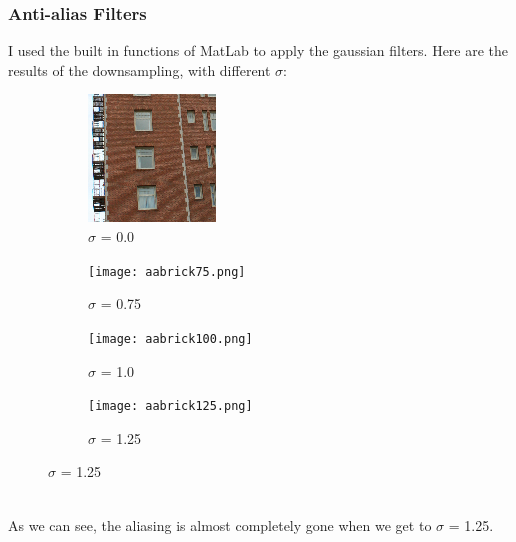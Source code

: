 \documentclass{article}
\begin{document}
\newpage
\subsubsection{Anti-alias Filters}
I used the built in functions of MatLab to apply the gaussian filters.
Here are the results of the downsampling, with different $\sigma$:
\begin{figure}[h]
	\centering
	\begin{subfigure}[b]{0.49\textwidth}
		\includegraphics[width = \textwidth]{aliasbrick4.png}
		\caption{$\sigma$ = 0.0}
		\label{fig:aliasbrick4.png}
	\end{subfigure}
	\begin{subfigure}[b]{0.49\textwidth}
		\texttt{[image: aabrick75.png]}
		\caption{$\sigma$ = 0.75}
		\label{fig:aabrick75.png}
	\end{subfigure}
	\begin{subfigure}[b]{0.49\textwidth}
		\texttt{[image: aabrick100.png]}
		\caption{$\sigma$ = 1.0}
		\label{fig:aabrick100.png}
	\end{subfigure}
	\begin{subfigure}[b]{0.49\textwidth}
		\texttt{[image: aabrick125.png]}
		\caption{$\sigma$ = 1.25}
		\label{fig:aabrick125.png}
	\end{subfigure}
\end{figure}
\\
As we can see, the aliasing is almost completely gone when we get to $\sigma$ = 1.25.
\end{document}
